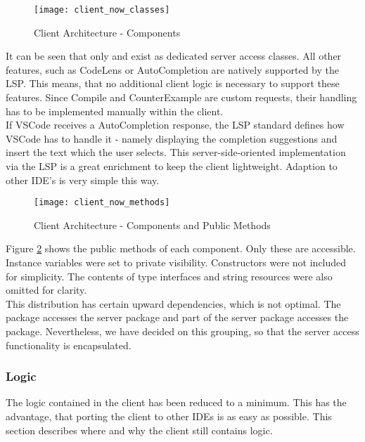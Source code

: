 \begin{figure}[H]
    \centering
    \texttt{[image: client\_now\_classes]}
    \caption{Client Architecture - Components}
    \label{fig:client_now_classes}
\end{figure}

It can be seen that only  and  exist as dedicated server access classes.
All other features, such as CodeLens or AutoCompletion are natively supported by the LSP.
This means, that no additional client logic is necessary to support these features.
Since Compile and CounterExample are custom requests,
their handling has to be implemented manually within the client.\\

If VSCode receives a AutoCompletion response, the LSP standard defines how VSCode has to handle it -
namely displaying the completion suggestions and insert the text which the user selects.
This server-side-oriented implementation via the LSP is a great enrichment to keep the client lightweight.
Adaption to other IDE's is very simple this way.

\begin{figure}[H]
    \centering
    \texttt{[image: client\_now\_methods]}
    \caption{Client Architecture - Components and Public Methods}
    \label{fig:client_now_methods}
\end{figure}

Figure \ref{fig:client_now_methods} shows the public methods of each component.
Only these are accessible.
Instance variables were set to private visibility.
Constructors were not included for simplicity.
The contents of type interfaces and string resources were also omitted for clarity.\\

This distribution has certain upward dependencies, which is not optimal.
The  package accesses the server package and part of the server package accesses the  package.
Nevertheless, we have decided on this grouping,
so that the server access functionality is encapsulated.

\subsubsection{Logic}
The logic contained in the client has been reduced to a minimum.
This has the advantage, that porting the client to other IDEs is as easy as possible.
This section describes where and why the client still contains logic.\\

